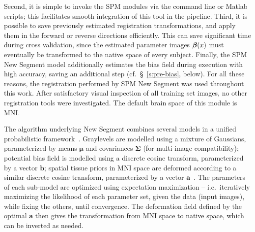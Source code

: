 Second, it is simple to invoke the SPM modules via the command line or Matlab scripts;
this facilitates smooth integration of this tool in the pipeline.
Third, it is possible to save previously estimated registration transformations,
and apply them in the forward or reverse directions efficiently.
This can save significant time during cross validation,
since the estimated parameter images $\bm{\beta}(x)$ must eventually be transformed
to the native space of every subject.
Finally, the SPM New Segment model additionally estimates the bias field during execution
with high accuracy, saving an additional step (cf.~\S~\ref{s:pre-bias}, below).
For all these reasons, the registration performed by SPM New Segment was used throughout this work.
After satisfactory visual inspection of all training set images,
no other registration tools were investigated.
The default brain space of this module is MNI.
\par
The algorithm underlying New Segment combines several models
in a unified probabilistic framework~\cite{Ashburner2005}.
Graylevels are modelled using a mixture of Gaussians,
parameterized by means $\bm{\mu}$ and covariances $\bm{\Sigma}$ (for-multi-image compatibility);
potential bias field is modelled using a discrete cosine transform,
parameterized by a vector $\bm{b}$;
spatial tissue priors in MNI space are deformed according to a similar discrete cosine transform,
parameterized by a vector $\bm{a}$~\cite{Ashburner1999}.
The parameters of each sub-model are optimized using expectation maximization
-- i.e.\ iteratively maximizing the likelihood of each parameter set,
given the data (input images), while fixing the others, until convergence.
The deformation field defined by the optimal $\bm{a}$ then gives
the transformation from MNI space to native space,
which can be inverted as needed.
